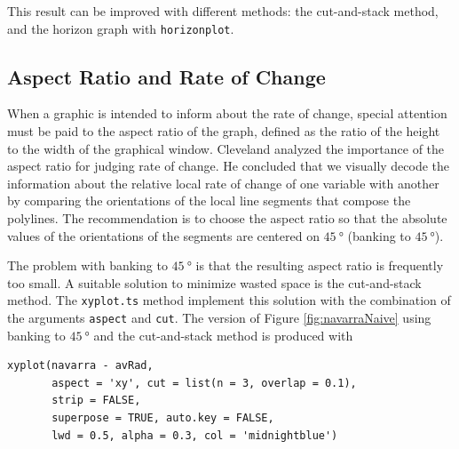 This result can be improved with different methods: the cut-and-stack
method, and the horizon graph with \texttt{horizonplot}.

\subsection{Aspect Ratio and Rate of Change}
\label{sec:orgc259de9}
When a graphic is intended to inform about the rate of change,
special attention must be paid to the aspect ratio of the graph,
defined as the ratio of the height to the width of the graphical
window. Cleveland analyzed the importance of the aspect ratio for
judging rate of change. He concluded that we visually decode the
information about the relative local rate of change of one
variable with another by comparing the orientations of the local
line segments that compose the polylines. The recommendation is to
choose the aspect ratio so that the absolute values of the
orientations of the segments are centered on \(\SI{45}{\degree}\) (banking
to \(\SI{45}{\degree}\)). 

The problem with banking to \(\SI{45}{\degree}\) is that the resulting
aspect ratio is frequently too small. A suitable solution to
minimize wasted space is the cut-and-stack method. The \texttt{xyplot.ts}
method implement this solution with the combination of the
arguments \texttt{aspect} and \texttt{cut}. The version of Figure
\ref{fig:navarraNaive} using banking to \(\SI{45}{\degree}\) and the
cut-and-stack method is produced with
\lstset{language=r,label= ,caption= ,captionpos=b,numbers=none}
\begin{lstlisting}
xyplot(navarra - avRad,
       aspect = 'xy', cut = list(n = 3, overlap = 0.1),
       strip = FALSE,
       superpose = TRUE, auto.key = FALSE,
       lwd = 0.5, alpha = 0.3, col = 'midnightblue')
\end{lstlisting}

